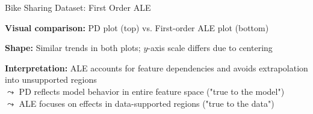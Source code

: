 \documentclass[10pt,compress,t,notes=noshow, xcolor=table]{beamer}
\begin{document}





\begin{framev}[align=top]{Bike Sharing Dataset: First Order ALE}
\begin{itemizeM}
\item \textbf{Visual comparison:} PD plot (top) vs. First-order ALE plot (bottom)
\item \textbf{Shape:} Similar trends in both plots; $y$-axis scale differs due to centering
\item \textbf{Interpretation:} ALE accounts for feature dependencies and avoids extrapolation into unsupported regions
\\$\leadsto$ PD reflects model behavior in entire feature space ("true to the model")\\
$\leadsto$ ALE focuses on effects in data-supported regions ("true to the data")
\end{itemizeM}
\end{framev}
\end{document}

